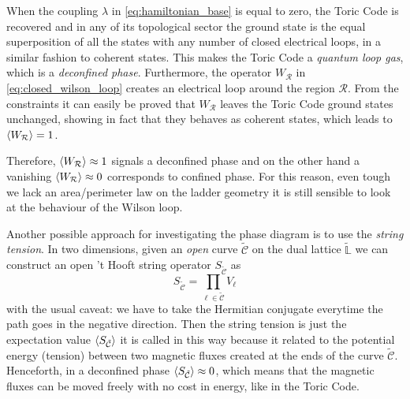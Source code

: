 When the coupling $\lambda$ in \eqref{eq:hamiltonian_base} is equal to zero, the Toric Code is recovered and in any of its topological sector the ground state is the equal superposition of all the states with any number of closed electrical loops, in a similar fashion to coherent states.
This makes the Toric Code a \emph{quantum loop gas}, which is a \emph{deconfined phase}.
Furthermore, the operator $W_{\mathcal{R}}$ in \eqref{eq:closed_wilson_loop} creates an electrical loop around the region $\mathcal{R}$.
From the constraints
it can easily be proved that $W_{\mathcal{R}}$ leaves the Toric Code ground states unchanged, showing in fact that they behaves as coherent states, which leads to $\ev{W_{\mathcal{R}}} = 1$.

Therefore, $\ev{W_{\mathcal{R}}} \approx 1$ signals a deconfined phase and on the other hand a vanishing $\ev{W_{\mathcal{R}}} \approx 0$ corresponds to confined phase.
For this reason, even tough we lack an area/perimeter law on the ladder geometry it is still sensible to look at the behaviour of the Wilson loop.


Another possible approach for investigating the phase diagram is to use the \emph{string tension}.
In two dimensions, given an \emph{open} curve $\tilde{\mathcal{C}}$ on the dual lattice $\tilde{\mathbb{L}}$ we can construct an open 't Hooft string operator $S_{\tilde{\mathcal{C}}}$ as
\begin{equation}
    S_{\tilde{\mathcal{C}}} = \prod_{\ell \in \tilde{\mathcal{C}}} V_{\ell}
\end{equation}
with the usual caveat: we have to take the Hermitian conjugate everytime the path goes in the negative direction.
Then the string tension is just the expectation value $\ev{S_{\tilde{\mathcal{C}}}}$ it is called in this way because it related to the potential energy (tension) between two magnetic fluxes created at the ends of the curve $\tilde{\mathcal{C}}$.
Henceforth, in a deconfined phase $\ev{S_{\tilde{\mathcal{C}}}} \approx 0$, which means that the magnetic fluxes can be moved freely with no cost in energy, like in the Toric Code.


